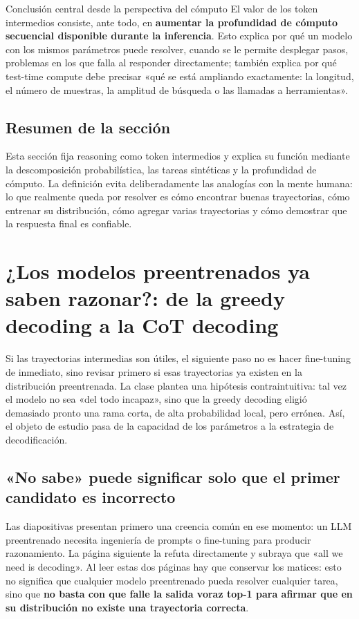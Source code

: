 \documentclass[a4paper]{article}
\begin{document}
\begin{importantbox}{Conclusión central desde la perspectiva del cómputo}
El valor de los token intermedios consiste, ante todo, en \textbf{aumentar la profundidad de cómputo secuencial disponible durante la inferencia}. Esto explica por qué un modelo con los mismos parámetros puede resolver, cuando se le permite desplegar pasos, problemas en los que falla al responder directamente; también explica por qué test-time compute debe precisar «qué se está ampliando exactamente: la longitud, el número de muestras, la amplitud de búsqueda o las llamadas a herramientas».
\end{importantbox}

\subsection{Resumen de la sección}

Esta sección fija reasoning como token intermedios y explica su función mediante la descomposición probabilística, las tareas sintéticas y la profundidad de cómputo. La definición evita deliberadamente las analogías con la mente humana: lo que realmente queda por resolver es cómo encontrar buenas trayectorias, cómo entrenar su distribución, cómo agregar varias trayectorias y cómo demostrar que la respuesta final es confiable.
\section{¿Los modelos preentrenados ya saben razonar?: de la greedy decoding a la CoT decoding}

Si las trayectorias intermedias son útiles, el siguiente paso no es hacer fine-tuning de inmediato, sino revisar primero si esas trayectorias ya existen en la distribución preentrenada. La clase plantea una hipótesis contraintuitiva: tal vez el modelo no sea «del todo incapaz», sino que la greedy decoding eligió demasiado pronto una rama corta, de alta probabilidad local, pero errónea. Así, el objeto de estudio pasa de la capacidad de los parámetros a la estrategia de decodificación.

\subsection{«No sabe» puede significar solo que el primer candidato es incorrecto}

Las diapositivas presentan primero una creencia común en ese momento: un LLM preentrenado necesita ingeniería de prompts o fine-tuning para producir razonamiento. La página siguiente la refuta directamente y subraya que «all we need is decoding». Al leer estas dos páginas hay que conservar los matices: esto no significa que cualquier modelo preentrenado pueda resolver cualquier tarea, sino que \textbf{no basta con que falle la salida voraz top-1 para afirmar que en su distribución no existe una trayectoria correcta}.
\end{document}
